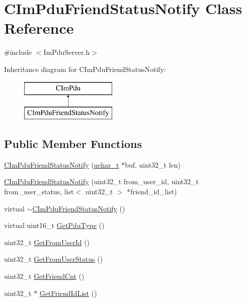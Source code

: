 \hypertarget{class_c_im_pdu_friend_status_notify}{}\section{C\+Im\+Pdu\+Friend\+Status\+Notify Class Reference}
\label{class_c_im_pdu_friend_status_notify}


{\ttfamily \#include $<$Im\+Pdu\+Server.\+h$>$}

Inheritance diagram for C\+Im\+Pdu\+Friend\+Status\+Notify\+:\begin{figure}[H]
\begin{center}
\leavevmode
\includegraphics[height=2.000000cm]{class_c_im_pdu_friend_status_notify}
\end{center}
\end{figure}
\subsection*{Public Member Functions}
\begin{DoxyCompactItemize}
\item 
\hyperlink{class_c_im_pdu_friend_status_notify_a7f36a4c86e54bff1037e0310bf6de88e}{C\+Im\+Pdu\+Friend\+Status\+Notify} (\hyperlink{base_2ostype_8h_a124ea0f8f4a23a0a286b5582137f0b8d}{uchar\+\_\+t} $\ast$buf, uint32\+\_\+t len)
\item 
\hyperlink{class_c_im_pdu_friend_status_notify_af18d886659d576d22b7aea7655c8c077}{C\+Im\+Pdu\+Friend\+Status\+Notify} (uint32\+\_\+t from\+\_\+user\+\_\+id, uint32\+\_\+t from\+\_\+user\+\_\+status, list$<$ uint32\+\_\+t $>$ $\ast$friend\+\_\+id\+\_\+list)
\item 
virtual \hyperlink{class_c_im_pdu_friend_status_notify_ae112d3e18adb1a31becc103253b1e6d2}{$\sim$\+C\+Im\+Pdu\+Friend\+Status\+Notify} ()
\item 
virtual uint16\+\_\+t \hyperlink{class_c_im_pdu_friend_status_notify_a6ba0f6d13386a239a784012c27b9b54e}{Get\+Pdu\+Type} ()
\item 
uint32\+\_\+t \hyperlink{class_c_im_pdu_friend_status_notify_a30333f10807c158dc72b31d126017d94}{Get\+From\+User\+Id} ()
\item 
uint32\+\_\+t \hyperlink{class_c_im_pdu_friend_status_notify_a86cb2efb60874192af0230387c9b7ac1}{Get\+From\+User\+Status} ()
\item 
uint32\+\_\+t \hyperlink{class_c_im_pdu_friend_status_notify_a9bb222057546c747bf1f030ea233154a}{Get\+Friend\+Cnt} ()
\item 
uint32\+\_\+t $\ast$ \hyperlink{class_c_im_pdu_friend_status_notify_a3cf08d9c66000ebcbc7fa56ea291624c}{Get\+Friend\+Id\+List} ()
\end{DoxyCompactItemize}
